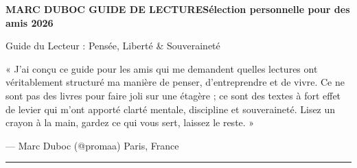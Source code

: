 \documentclass[10pt]{article}
\begin{document}
\noindent
{\footnotesize\bfseries\color{inkmuted}\MakeUppercase{Marc Duboc \textperiodcentered{} Guide de Lecture}\hfill{\mdseries\color{inkfaint}Sélection personnelle pour des amis \textperiodcentered{} 2026}}\par\vspace{4mm}
{\huge\fraunces\color{ink}Guide du Lecteur : Pensée, Liberté \& Souveraineté}\par\vspace{4mm}
\begin{prologuebox}
  {\small\frauncesit\color{inksoft}« J’ai conçu ce guide pour les amis qui me demandent quelles lectures ont véritablement structuré ma manière de penser, d'entreprendre et de vivre. Ce ne sont pas des livres pour faire joli sur une étagère ; ce sont des textes à fort effet de levier qui m'ont apporté clarté mentale, discipline et souveraineté. Lisez un crayon à la main, gardez ce qui vous sert, laissez le reste. »}\par\vspace{2mm}
  {\footnotesize\color{inkfaint}— Marc Duboc (@promaa) \textperiodcentered{} Paris, France}
\end{prologuebox}\par\vspace{4mm}
\par\vspace{1mm}\textcolor{rulestrong}{\rule{\linewidth}{0.5pt}}\par\vspace{4mm}
\end{document}
